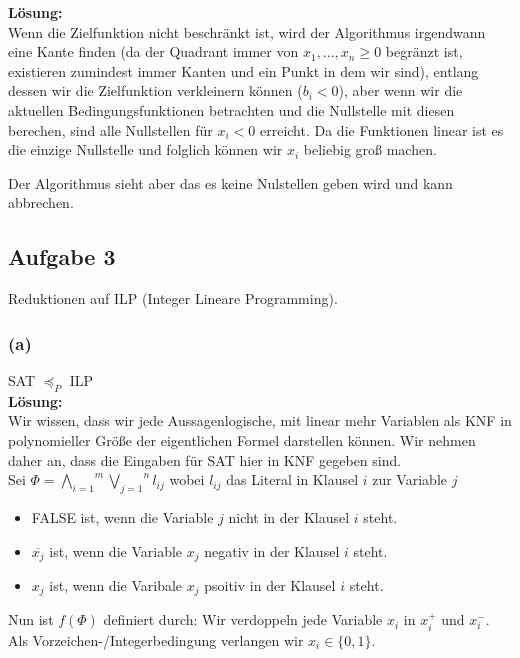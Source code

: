 \documentclass[11pt,a4paper,ngerman]{article}
\begin{document}
\textbf{Lösung:}\\

Wenn die Zielfunktion nicht beschränkt ist, wird der Algorithmus irgendwann eine
Kante finden (da der Quadrant immer von $x_1, ... , x_n \geq 0$ begränzt ist, existieren
zumindest immer Kanten und ein Punkt in dem wir sind), entlang dessen wir die Zielfunktion
verkleinern können ($b_i < 0$), aber wenn wir die aktuellen Bedingungsfunktionen betrachten
und die Nullstelle mit diesen berechen, sind alle Nullstellen für $x_i < 0$ erreicht.
Da die Funktionen linear ist es die einzige Nullstelle und folglich können wir $x_i$ beliebig groß machen.

Der Algorithmus sieht aber das es keine Nulstellen geben wird und kann abbrechen.

\subsection*{Aufgabe 3}

Reduktionen auf ILP (Integer Lineare Programming).

\subsubsection*{(a)}
SAT $\preceq_P$ ILP\\

\textbf{Lösung:}\\

Wir wissen, dass wir jede Aussagenlogische, mit linear mehr Variablen als KNF in polynomieller Größe
der eigentlichen Formel darstellen können. Wir nehmen daher an, dass die Eingaben für SAT hier in KNF gegeben sind.\\

Sei $\Phi = \overset{m}{\underset{i=1}{\bigwedge}} \overset{n}{\underset{j=1}{\bigvee}} l_{ij}$
wobei $l_{ij}$ das Literal in Klausel $i$ zur Variable $j$
\begin{itemize}
    \item FALSE ist, wenn die Variable $j$ nicht in der Klausel $i$ steht.
    \item $\overline{x_j}$ ist, wenn die Variable $x_j$ negativ in der Klausel $i$ steht.
    \item $x_j$ ist, wenn die Varibale $x_j$ psoitiv in der Klausel $i$ steht.
\end{itemize}

Nun ist $f(\Phi)$ definiert durch:
Wir verdoppeln jede Variable $x_i$ in $x_i^+$ und $x_i^-$.
Als Vorzeichen-/Integerbedingung verlangen wir $x_i \in \{0,1\}$.\\
\end{document}
